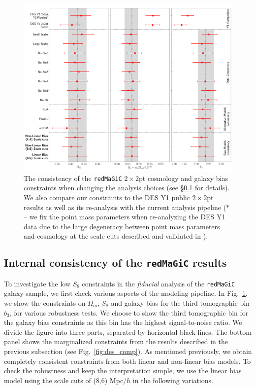 \documentclass[aps, prd,twocolumn,superscriptaddress,nofootinbib,preprintnumbers]{revtex4-1}
\newcommand{\om}{\ensuremath{\Omega_{\mathrm m}}}
\newcommand{\redmagic}{\texttt{redMaGiC} }
\begin{document}
\begin{figure}
\includegraphics[width=\textwidth]{figs/2x2pt_consistency.pdf}
\caption[]{The consistency of the \redmagic $2\times2$pt cosmology and galaxy bias constraints when changing the analysis choices (see \S\ref{sec:internal_consistency} for details). We also compare our constraints to the DES Y1 public $2\times2$pt results as well as its re-analysis with the current analysis pipeline ($*$ -- we fix the point mass parameters when re-analyzing the DES Y1 data due to the large degeneracy between point mass parameters and cosmology at the scale cuts described and validated in \citet{Abbott_2018}).}
\label{fig:2x2pt_consistency}
\end{figure}


\subsection{Internal consistency of the \redmagic results}
\label{sec:internal_consistency}

To investigate the low $S_8$ constraints in the \textit{fiducial} analysis of the \redmagic galaxy sample, we first check various aspects of the modeling pipeline. In Fig.~\ref{fig:2x2pt_consistency}, we show the constraints on $\om$, $S_8$ and galaxy bias for the third tomographic bin $b_3$, for various robustness tests. We choose to show the third tomographic bin for the galaxy bias constraints as this bin has the highest signal-to-noise ratio. We divide the figure into three parts, separated by horizontal black lines. The bottom panel shows the marginalized constraints from the results described in the previous subsection (see Fig.~\ref{fig:des_comp}). As mentioned previously, we obtain completely consistent constraints from both linear and non-linear bias models. To check the robustness and keep the interpretation simple, we use the linear bias model using the scale cuts of (8,6) Mpc/$h$ in the following variations.  
\end{document}

